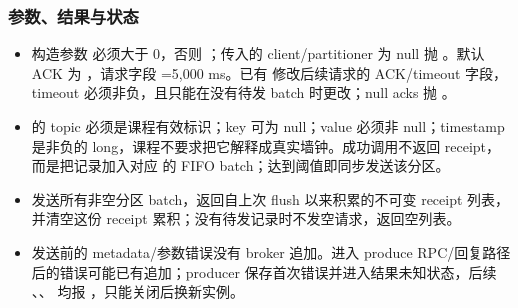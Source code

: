 \subsubsection*{参数、结果与状态}
\begin{itemize}
\item 构造参数  必须大于 0，否则 ；传入的 client/partitioner 为 null 抛 。默认 ACK 为 ，请求字段 =5,000 ms。已有  修改后续请求的 ACK/timeout 字段，timeout 必须非负，且只能在没有待发 batch 时更改；null acks 抛 。
\item {} 的 topic 必须是课程有效标识；key 可为 null；value 必须非 null；timestamp 是非负的 long，课程不要求把它解释成真实墙钟。成功调用不返回 receipt，而是把记录加入对应  的 FIFO batch；达到阈值即同步发送该分区。
\item {} 发送所有非空分区 batch，返回自上次 flush 以来积累的不可变 receipt 列表，并清空这份 receipt 累积；没有待发记录时不发空请求，返回空列表。
\item 发送前的 metadata/参数错误没有 broker 追加。进入 produce RPC/回复路径后的错误可能已有追加；producer 保存首次错误并进入结果未知状态，后续 、、 均报 ，只能关闭后换新实例。
\end{itemize}
